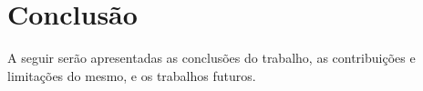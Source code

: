 
\chapter{Conclusão}
    \label{cha:conclusao}

    A seguir serão apresentadas as conclusões do trabalho, as contribuições e limitações do mesmo, e os trabalhos futuros.

    

    

    

    
